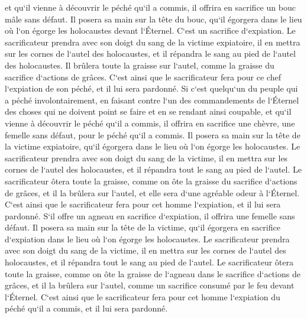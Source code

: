 \verse et qu`il vienne à découvrir le péché qu`il a commis, il offrira en sacrifice un bouc mâle sans défaut. 
\verse Il posera sa main sur la tête du bouc, qu`il égorgera dans le lieu où l`on égorge les holocaustes devant l`Éternel. C`est un sacrifice d`expiation. 
\verse Le sacrificateur prendra avec son doigt du sang de la victime expiatoire, il en mettra sur les cornes de l`autel des holocaustes, et il répandra le sang au pied de l`autel des holocaustes. 
\verse Il brûlera toute la graisse sur l`autel, comme la graisse du sacrifice d`actions de grâces. C`est ainsi que le sacrificateur fera pour ce chef l`expiation de son péché, et il lui sera pardonné. 
\verse Si c`est quelqu`un du peuple qui a péché involontairement, en faisant contre l`un des commandements de l`Éternel des choses qui ne doivent point se faire et en se rendant ainsi coupable, 
\verse et qu`il vienne à découvrir le péché qu`il a commis, il offrira en sacrifice une chèvre, une femelle sans défaut, pour le péché qu`il a commis. 
\verse Il posera sa main sur la tête de la victime expiatoire, qu`il égorgera dans le lieu où l`on égorge les holocaustes. 
\verse Le sacrificateur prendra avec son doigt du sang de la victime, il en mettra sur les cornes de l`autel des holocaustes, et il répandra tout le sang au pied de l`autel. 
\verse Le sacrificateur ôtera toute la graisse, comme on ôte la graisse du sacrifice d`actions de grâces, et il la brûlera sur l`autel, et elle sera d`une agréable odeur à l`Éternel. C`est ainsi que le sacrificateur fera pour cet homme l`expiation, et il lui sera pardonné. 
\verse S`il offre un agneau en sacrifice d`expiation, il offrira une femelle sans défaut. 
\verse Il posera sa main sur la tête de la victime, qu`il égorgera en sacrifice d`expiation dans le lieu où l`on égorge les holocaustes. 
\verse Le sacrificateur prendra avec son doigt du sang de la victime, il en mettra sur les cornes de l`autel des holocaustes, et il répandra tout le sang au pied de l`autel. 
\verse Le sacrificateur ôtera toute la graisse, comme on ôte la graisse de l`agneau dans le sacrifice d`actions de grâces, et il la brûlera sur l`autel, comme un sacrifice consumé par le feu devant l`Éternel. C`est ainsi que le sacrificateur fera pour cet homme l`expiation du péché qu`il a commis, et il lui sera pardonné. 

